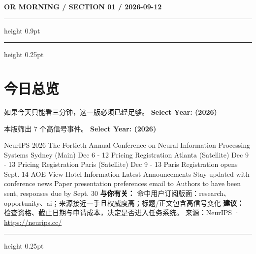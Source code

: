 \documentclass[10.5pt]{ctexart}
\begin{document}
{\small\bfseries OR MORNING / SECTION 01 / 2026-09-12}
\vspace{2mm}
\hrule height 0.9pt
\vspace{1.5mm}
\hrule height 0.25pt
\vspace{4mm}
\section*{今日总览}
{\color{ormuted} 如果今天只能看三分钟，这一版必须已经足够。}
\vspace{2mm}
{\fontsize{25}{29}\selectfont\bfseries Select Year: (2026)}\par
\vspace{2mm}
{\large 本版筛出 7 个高信号事件。}
\vspace{3mm}
{\Large\bfseries Select Year: (2026)}\par
NeurIPS 2026 The Fortieth Annual Conference on Neural Information Processing Systems Sydney (Main) Dec 6 - 12 Pricing Registration Atlanta (Satellite) Dec 9 - 13 Pricing Registration Paris (Satellite) Dec 9 - 13 Paris Registration opens Sept. 14 AOE View Hotel Information Latest Announcements Stay updated with conference news Paper presentation preferences email to Authors to have been sent, responses due by Sept. 30
\textbf{与你有关：} 命中用户订阅版面：research、opportunity、ai；来源接近一手且权威度高；标题/正文包含高信号变化
\textbf{建议：} 检查资格、截止日期与申请成本，决定是否进入任务系统。
{\footnotesize\color{ormuted} 来源：NeurIPS · \url{https://neurips.cc/}}
\vspace{3mm}
\hrule height 0.25pt
\vspace{3mm}
\end{document}
